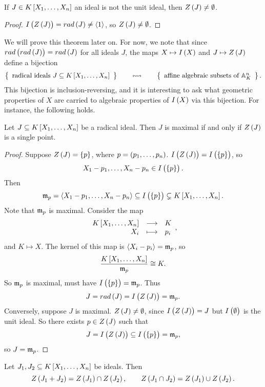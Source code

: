 \begin{corollary}
If $ J \in K\sbr{X_1, \dots, X_n} $ an ideal is not the unit ideal, then $ Z\br{J} \ne \emptyset $.
\end{corollary}

\begin{proof}
$ I\br{Z\br{J}} = rad\br{J} \ne \abr{1} $, so $ Z\br{J} \ne \emptyset $.
\end{proof}


We will prove this theorem later on. For now, we note that since $ rad\br{rad\br{J}} = rad\br{J} $ for all ideals $ J $, the maps $ X \mapsto I\br{X} $ and $ J \mapsto Z\br{J} $ define a bijection
$$ \correspondence{\text{radical ideals} \ J \subseteq K\sbr{X_1, \dots, X_n}}{\text{affine algebraic subsets of} \ \A_K^n}. $$
This bijection is inclusion-reversing, and it is interesting to ask what geometric properties of $ X $ are carried to algebraic properties of $ I\br{X} $ via this bijection. For instance, the following holds.

\begin{proposition}
Let $ J \subseteq K\sbr{X_1, \dots, X_n} $ be a radical ideal. Then $ J $ is maximal if and only if $ Z\br{J} $ is a single point.
\end{proposition}

\begin{proof}
Suppose $ Z\br{J} = \cbr{p} $, where $ p = \br{p_1, \dots, p_n} $. $ I\br{Z\br{J}} = I\br{\cbr{p}} $, so
$$ X_1 - p_1, \dots, X_n - p_n \in I\br{\cbr{p}}. $$
Then
$$ \mm_p = \abr{X_1 - p_1, \dots, X_n - p_n} \subseteq I\br{\cbr{p}} \subsetneq K\sbr{X_1, \dots, X_n}. $$
Note that $ \mathfrak{m}_p $ is maximal. Consider the map
$$ \function{K\sbr{X_1, \dots, X_n}}{K}{X_i}{p_i}, $$
and $ K \mapsto X $. The kernel of this map is $ \left\langle X_i - p_i \right\rangle = \mathfrak{m}_p $, so
$$ \dfrac{K\sbr{X_1, \dots, X_n}}{\mm_p} \cong K. $$
So $ \mathfrak{m}_p $ is maximal, must have $ I\br{\cbr{p}} = \mm_p $. Thus
$$ J = rad\br{J} = I\br{Z\br{J}} = \mm_p. $$
Conversely, suppose $ J $ is maximal. $ Z\br{J} \ne \emptyset $, since $ I\br{Z\br{J}} = J $ but $ I\br{\emptyset} $ is the unit ideal. So there exists $ p \in Z\br{J} $ such that
$$ J = I\br{Z\br{J}} \subseteq I\br{\cbr{p}} = \mm_p, $$
so $ J = \mathfrak{m}_p $.
\end{proof}

\pagebreak

\begin{proposition}
Let $ J_1, J_2 \subseteq K\sbr{X_1, \dots, X_n} $ be ideals. Then
$$ Z\br{J_1 + J_2} = Z\br{J_1} \cap Z\br{J_2}, \qquad Z\br{J_1 \cap J_2} = Z\br{J_1} \cup Z\br{J_2}. $$
\end{proposition}

